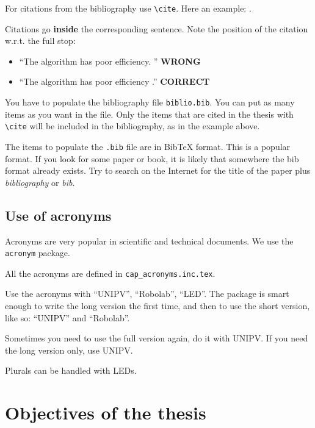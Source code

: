 For citations from the bibliography use \texttt{\textbackslash cite}.
Here an example: \cite{example-citation}.

Citations go \textbf{inside} the corresponding sentence.
Note the position of the citation w.r.t. the full stop:

\begin{itemize}
\item \enquote{The algorithm has poor efficiency. \cite{example-citation}} \textbf{WRONG}
\item \enquote{The algorithm has poor efficiency \cite{example-citation}.} \textbf{CORRECT}
\end{itemize}

You have to populate the bibliography file \texttt{biblio.bib}.
You can put as many items as you want in the file.
Only the items that are cited in the thesis with \texttt{\textbackslash cite} will be included in the bibliography, as in the example above.

The items to populate the \texttt{.bib} file are in BibTeX format.
This is a popular format.
If you look for some paper or book, it is likely that somewhere the bib format already exists.
Try to search on the Internet for the title of the paper plus \textit{bibliography} or \textit{bib}.

\subsection{Use of acronyms}

Acronyms are very popular in scientific and technical documents.
We use the \texttt{acronym} package.

All the acronyms are defined in \texttt{cap\_acronyms.inc.tex}.

Use the acronyms with \enquote{\ac{UNIPV}}, \enquote{\ac{Robolab}}, \enquote{\ac{LED}}.
The package is smart enough to write the long version the first time, and then to use the short version, like so: \enquote{\ac{UNIPV}} and \enquote{\ac{Robolab}}.

Sometimes you need to use the full version again, do it with \acf{UNIPV}.
If you need the long version only, use \acl{UNIPV}.

Plurals can be handled with \acp{LED}.

\section{Objectives of the thesis}

